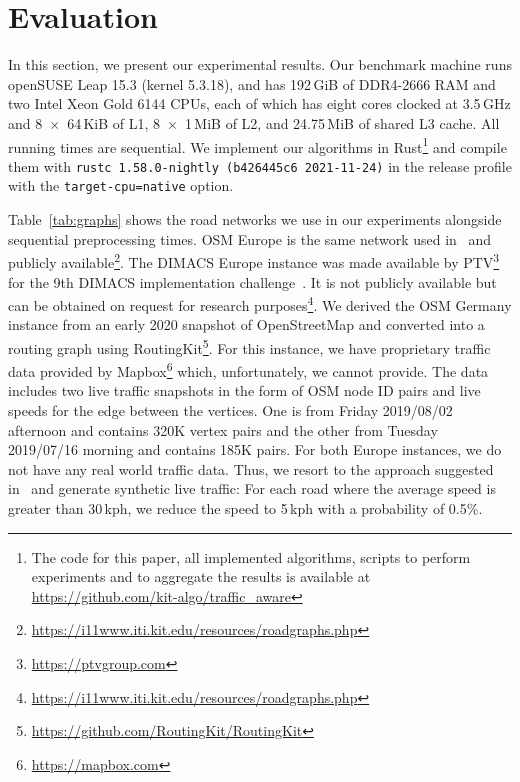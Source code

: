 \documentclass[a4paper,UKenglish,cleveref, autoref, thm-restate]{lipics-v2021}
\begin{document}
\section{Evaluation}\label{sec:eval}

In this section, we present our experimental results.
Our benchmark machine runs openSUSE Leap 15.3 (kernel 5.3.18), and has 192\,GiB of DDR4-2666 RAM and two Intel Xeon Gold 6144 CPUs, each of which has eight cores clocked at 3.5\,GHz and 8~$\times$~64\,KiB of L1, 8~$\times$~1\,MiB of L2, and 24.75\,MiB of shared L3 cache.
All running times are sequential.
We implement our algorithms in Rust\footnote{The code for this paper, all implemented algorithms, scripts to perform experiments and to aggregate the results is available at \url{https://github.com/kit-algo/traffic_aware}} and compile them with \texttt{rustc 1.58.0-nightly (b426445c6 2021-11-24)} in the release profile with the \texttt{target-cpu=native} option.

\begin{table}
\centering
\caption{
Instances used in the evaluation with sequential preprocessing running times to construct a CCH-Potential.
Phase 1 needs to be run only once for each graph, Phase 2 once for each weight function, or when a weight function changes.
}\label{tab:graphs}

\end{table}

Table~\ref{tab:graphs} shows the road networks we use in our experiments alongside sequential preprocessing times.
OSM Europe is the same network used in~\cite{dss-tarrn-18} and publicly available\footnote{\url{https://i11www.iti.kit.edu/resources/roadgraphs.php}}.
The DIMACS Europe instance was made available by PTV\footnote{\url{https://ptvgroup.com}} for the 9th DIMACS implementation challenge~\cite{DemetrescuGJ09}.
It is not publicly available but can be obtained on request for research purposes\footnote{\url{https://i11www.iti.kit.edu/resources/roadgraphs.php}}.
We derived the OSM Germany instance from an early 2020 snapshot of OpenStreetMap and converted into a routing graph using RoutingKit\footnote{\url{https://github.com/RoutingKit/RoutingKit}}.
For this instance, we have proprietary traffic data provided by Mapbox\footnote{\url{https://mapbox.com}} which, unfortunately, we cannot provide.
The data includes two live traffic snapshots in the form of OSM node ID pairs and live speeds for the edge between the vertices.
One is from Friday 2019/08/02 afternoon and contains 320K vertex pairs and the other from Tuesday 2019/07/16 morning and contains 185K pairs.
For both Europe instances, we do not have any real world traffic data.
Thus, we resort to the approach suggested in~\cite{dss-tarrn-18} and generate synthetic live traffic:
For each road where the average speed is greater than 30\,kph, we reduce the speed to 5\,kph with a probability of 0.5\%.
\end{document}
